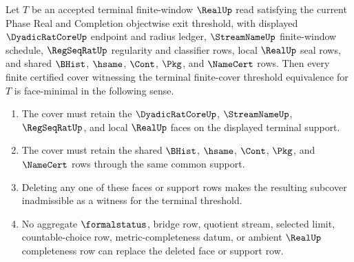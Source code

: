 \begin{theorem}
\label{thm:real-l10-terminal-finite-cover-face-minimality}
Let $T$ be an accepted terminal finite-window $\RealUp$ read satisfying the
current Phase Real and Completion objectwise exit threshold, with displayed
$\DyadicRatCoreUp$ endpoint and radius ledger, $\StreamNameUp$ finite-window
schedule, $\RegSeqRatUp$ regularity and classifier rows, local $\RealUp$ seal
rows, and shared $\BHist$, $\hsame$, $\Cont$, $\Pkg$, and $\NameCert$ rows.
Then every finite certified cover witnessing the terminal finite-cover
threshold equivalence for $T$ is face-minimal in the following sense.
\begin{enumerate}
\item The cover must retain the $\DyadicRatCoreUp$, $\StreamNameUp$,
$\RegSeqRatUp$, and local $\RealUp$ faces on the displayed terminal support.
\item The cover must retain the shared $\BHist$, $\hsame$, $\Cont$, $\Pkg$,
and $\NameCert$ rows through the same common support.
\item Deleting any one of these faces or support rows makes the resulting
subcover inadmissible as a witness for the terminal threshold.
\item No aggregate $\formalstatus$, bridge row, quotient stream, selected
limit, countable-choice row, metric-completeness datum, or ambient $\RealUp$
completeness row can replace the deleted face or support row.
\end{enumerate}
\end{theorem}
